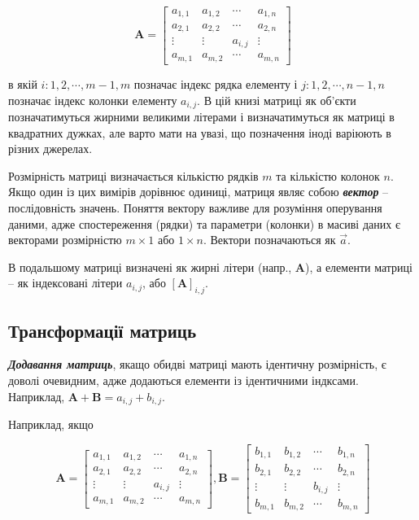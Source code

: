\documentclass[
  11pt,
]{book}
\begin{document}
\[\textbf{A} = \begin{bmatrix}
a_{1, 1} & a_{1,2} & \cdots & a_{1, n}\\
a_{2, 1} & a_{2,2} & \cdots & a_{2, n}\\
\vdots & \vdots & a_{i,j} & \vdots \\
a_{m, 1} & a_{m,2} & \cdots & a_{m, n}
\end{bmatrix}\]

в якій \(i: 1, 2, \cdots, m-1, m\) позначає індекс рядка елементу і
\(j: 1, 2, \cdots, n-1, n\) позначає індекс колонки елементу
\(a_{i, j}\). В цій книзі матриці як об'єкти позначатимуться жирними
великими літерами і визначатимуться як матриці в квадратних дужках, але
варто мати на увазі, що позначення іноді варіюють в різних джерелах.

Розмірність матриці визначається кількістю рядків \(m\) та кількістю
колонок \(n\). Якщо один із цих вимірів дорівнює одиниці, матриця являє
собою \textbf{\emph{вектор}} -- послідовність значень. Поняття вектору
важливе для розуміння оперування даними, адже спостереження (рядки) та
параметри (колонки) в масиві даних є векторами розмірністю
\(m \times 1\) або \(1 \times n\). Вектори позначаються як \(\vec{a}\).

В подальшому матриці визначені як жирні літери (напр., \(\mathbf{A}\)),
а елементи матриці -- як індексовані літери \(a_{i,j}\), або
\([\mathbf{A}]_{i,j}\).

\subsection{Трансформації
матриць}\label{ux442ux440ux430ux43dux441ux444ux43eux440ux43cux430ux446ux456ux457-ux43cux430ux442ux440ux438ux446ux44c}

\textbf{\emph{Додавання матриць}}, якащо обидві матриці мають ідентичну
розмірність, є доволі очевидним, адже додаються елементи із ідентичними
індксами. Наприклад, \(\mathbf{A}+\mathbf{B} = a_{i,j}+b_{i, j}\).

Наприклад, якщо

\[\mathbf{A} = \begin{bmatrix}
a_{1, 1} & a_{1,2} & \cdots & a_{1, n}\\
a_{2, 1} & a_{2,2} & \cdots & a_{2, n}\\
\vdots & \vdots & a_{i,j} & \vdots \\
a_{m, 1} & a_{m,2} & \cdots & a_{m, n}
\end{bmatrix},
\mathbf{B} = \begin{bmatrix}
b_{1, 1} & b_{1,2} & \cdots & b_{1, n}\\
b_{2, 1} & b_{2,2} & \cdots & b_{2, n}\\
\vdots & \vdots & b_{i,j} & \vdots \\
b_{m, 1} & b_{m,2} & \cdots & b_{m, n}
\end{bmatrix}\]
\end{document}
